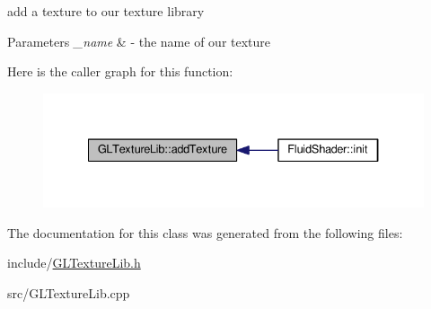 add a texture to our texture library 


\begin{DoxyParams}{Parameters}
{\em \-\_\-name} & -\/ the name of our texture \\
\hline
\end{DoxyParams}


Here is the caller graph for this function\-:\nopagebreak
\begin{figure}[H]
\begin{center}
\leavevmode
\includegraphics[width=334pt]{class_g_l_texture_lib_a778cde3734906f46649defdda30d7d7e_icgraph}
\end{center}
\end{figure}




The documentation for this class was generated from the following files\-:\begin{DoxyCompactItemize}
\item 
include/\hyperlink{_g_l_texture_lib_8h}{G\-L\-Texture\-Lib.\-h}\item 
src/G\-L\-Texture\-Lib.\-cpp\end{DoxyCompactItemize}

